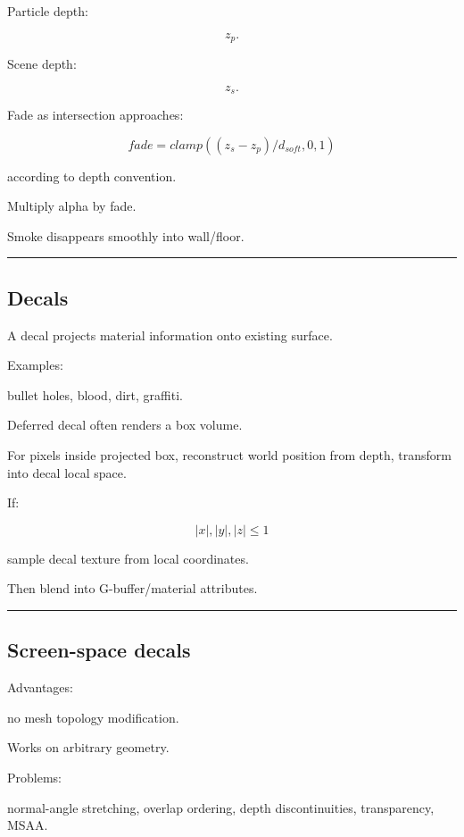 Particle depth:

\[
z_p.
\]

Scene depth:

\[
z_s.
\]

Fade as intersection approaches:

\[
\boxed{
fade=
clamp(
(z_s-z_p)/d_{soft},
0,1
)
}
\]

according to depth convention.

Multiply alpha by fade.

Smoke disappears smoothly into wall/floor.

\begin{center}\rule{0.5\linewidth}{0.5pt}\end{center}

\subsection{Decals}\label{04-visual-computing-ii-ch040-decals}

A decal projects material information onto existing surface.

Examples:

bullet holes, blood, dirt, graffiti.

Deferred decal often renders a box volume.

For pixels inside projected box, reconstruct world position from depth, transform into decal local space.

If:

\[
|x|,|y|,|z|\le1
\]

sample decal texture from local coordinates.

Then blend into G-buffer/material attributes.

\begin{center}\rule{0.5\linewidth}{0.5pt}\end{center}

\subsection{Screen-space decals}\label{04-visual-computing-ii-ch040-screen-space-decals}

Advantages:

no mesh topology modification.

Works on arbitrary geometry.

Problems:

normal-angle stretching, overlap ordering, depth discontinuities, transparency, MSAA.

